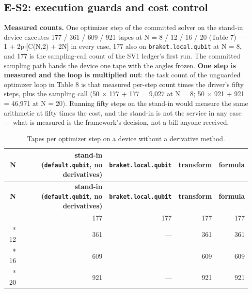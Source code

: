 \documentclass[acmsmall,screen,review]{acmart}
\begin{document}
\subsection{E-S2: execution guards and cost control}

\textbf{Measured counts.} One optimizer step of the committed solver on the stand-in device executes 177 / 361 / 609 / 921 tapes at N = 8 / 12 / 16 / 20 (Table 7) --- 1 + 2p$\cdot$[C(N,2) + 2N] in every case, 177 also on \texttt{braket.\allowbreak{}local.\allowbreak{}qubit} at N = 8, and 177 is the sampling-call count of the SV1 ledger's first run. The committed sampling path hands the device one tape with the angles frozen. \textbf{One step is measured and the loop is multiplied out}: the task count of the unguarded optimizer loop in Table 8 is that measured per-step count times the driver's fifty steps, plus the sampling call (50 $\times$ 177 + 177 = 9,027 at N = 8; 50 $\times$ 921 + 921 = 46,971 at N = 20). Running fifty steps on the stand-in would measure the same arithmetic at fifty times the cost, and the stand-in is not the service in any case --- what is measured is the framework's decision, not a bill anyone received.



\begingroup
\small
\setlength\LTleft{\fill}
\setlength\LTright{\fill}
\begin{longtable}{rrrrr}
\caption{Tapes per optimizer step on a device without a derivative method.}\label{tab:7} \\
\toprule
\textbf{N} & \textbf{stand-in (\texttt{default.qubit}, no derivatives)} & \textbf{\texttt{braket.\allowbreak{}local.\allowbreak{}qubit}} & \textbf{transform} & \textbf{formula} \\
\midrule
\endfirsthead
\toprule
\textbf{N} & \textbf{stand-in (\texttt{default.qubit}, no derivatives)} & \textbf{\texttt{braket.\allowbreak{}local.\allowbreak{}qubit}} & \textbf{transform} & \textbf{formula} \\
\midrule
\endhead
\endfoot
\bottomrule
\endlastfoot
8 & 177 & 177 & 177 & 177 \\*
12 & 361 & --- & 361 & 361 \\*
16 & 609 & --- & 609 & 609 \\*
20 & 921 & --- & 921 & 921 \\
\end{longtable}
\endgroup
\end{document}
